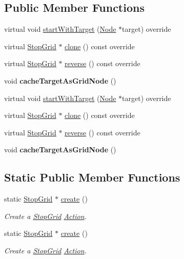 \subsection*{Public Member Functions}
\begin{DoxyCompactItemize}
\item 
virtual void \hyperlink{classStopGrid_ac08e33d5e58962f6b9e1048c10c5ea44}{start\+With\+Target} (\hyperlink{classNode}{Node} $\ast$target) override
\item 
virtual \hyperlink{classStopGrid}{Stop\+Grid} $\ast$ \hyperlink{classStopGrid_a3ab7a499f088f1ef4ce41a4131761bbf}{clone} () const override
\item 
virtual \hyperlink{classStopGrid}{Stop\+Grid} $\ast$ \hyperlink{classStopGrid_a02dcf952035340874d9b8a207e0c4da9}{reverse} () const override
\item 
\mbox{\label{classStopGrid_a313cf3b69fbe0acadaf3079d2ef2adea}} 
void {\bfseries cache\+Target\+As\+Grid\+Node} ()
\item 
virtual void \hyperlink{classStopGrid_a1fc959f156e77a97e5d49c7cad546be1}{start\+With\+Target} (\hyperlink{classNode}{Node} $\ast$target) override
\item 
virtual \hyperlink{classStopGrid}{Stop\+Grid} $\ast$ \hyperlink{classStopGrid_a08d436f2ede344933b7e7914ba5bc16d}{clone} () const override
\item 
virtual \hyperlink{classStopGrid}{Stop\+Grid} $\ast$ \hyperlink{classStopGrid_a8db549ab4f3da4564fadefb33f677517}{reverse} () const override
\item 
\mbox{\label{classStopGrid_a313cf3b69fbe0acadaf3079d2ef2adea}} 
void {\bfseries cache\+Target\+As\+Grid\+Node} ()
\end{DoxyCompactItemize}
\subsection*{Static Public Member Functions}
\begin{DoxyCompactItemize}
\item 
static \hyperlink{classStopGrid}{Stop\+Grid} $\ast$ \hyperlink{classStopGrid_a75cbdf91c486614067c28d051eddafd0}{create} ()
\begin{DoxyCompactList}\small\item\em Create a \hyperlink{classStopGrid}{Stop\+Grid} \hyperlink{classAction}{Action}. \end{DoxyCompactList}\item 
static \hyperlink{classStopGrid}{Stop\+Grid} $\ast$ \hyperlink{classStopGrid_a2f8d55f74d7fa184b7723f8e6e026c47}{create} ()
\begin{DoxyCompactList}\small\item\em Create a \hyperlink{classStopGrid}{Stop\+Grid} \hyperlink{classAction}{Action}. \end{DoxyCompactList}\end{DoxyCompactItemize}
